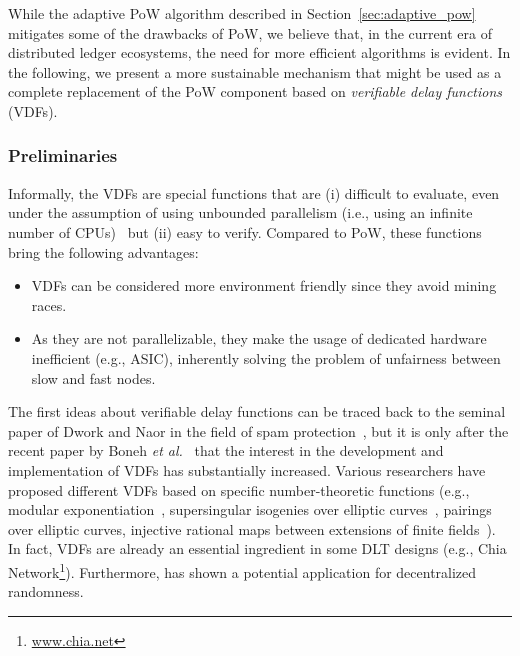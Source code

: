 \documentclass[../main.tex]{subfiles}
\begin{document}
While the adaptive PoW algorithm described in Section~\ref{sec:adaptive_pow} mitigates some of the drawbacks of PoW, we believe that, in the current era of distributed ledger ecosystems, the need for more efficient algorithms is evident. In the following, we present a more sustainable mechanism that might be used as a complete replacement of the PoW component based on \textit{verifiable delay functions} (VDFs).

\subsubsection{Preliminaries}

Informally, the VDFs are special functions that are (i) difficult to evaluate, even under the assumption of using unbounded parallelism (i.e., using an infinite number of CPUs)~\cite{borodin1975} but (ii) easy to verify. Compared to PoW, these functions bring the following advantages:
\begin{itemize}
    \item VDFs can be considered more environment friendly since they avoid mining races.
    \item As they are not parallelizable, they make the usage of dedicated hardware inefficient (e.g., ASIC), inherently solving the problem of unfairness between slow and fast nodes.
\end{itemize}

The first ideas about verifiable delay functions can be traced back to the seminal paper of Dwork and Naor in the field of spam protection~\cite{dwork1993}, but it is only after the recent paper by Boneh \textit{et al.}~\cite{boneh2018} that the interest in the development and implementation of VDFs has substantially increased. Various researchers have proposed different VDFs based on specific number-theoretic functions (e.g., modular exponentiation~\cite{dwork1993, pietrzak2018}, supersingular isogenies over elliptic curves~\cite{defeo2019}, pairings over elliptic curves, injective rational maps between extensions of finite fields~\cite{boneh2018}). In fact, VDFs are already an essential ingredient in some DLT designs (e.g., Chia Network\footnote{\url{www.chia.net}}). Furthermore, \cite{boneh2018} has shown a potential application for decentralized randomness.
\end{document}
